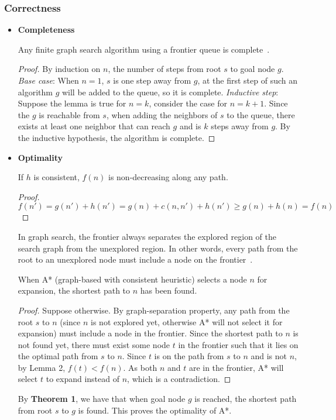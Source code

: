 \documentclass{llncs}
\begin{document}
\subsubsection{Correctness}
\begin{itemize}
	\item[] \textbf{Completeness}
	\begin{lemma} 
	Any finite graph search algorithm using a frontier queue is complete~\cite{sertac}.
	\end{lemma} 
	\begin{proof} 
	By induction on $n$, the number of steps from root $s$ to goal node $g$. \emph{Base case}: When $n=1$, $s$ is one step away from $g$, at the first step of such an algorithm $g$ will be added to the queue, so it is complete. \emph{Inductive step}: Suppose the lemma is true for $n=k$, consider the case for $n=k+1$. Since the $g$ is reachable from $s$, when adding the neighbors of $s$ to the queue, there exists at least one neighbor that can reach $g$ and is $k$ steps away from $g$. By the inductive hypothesis, the algorithm is complete. 
	\end{proof}
	\item[] \textbf{Optimality}
	\begin{lemma} 
	If $h$ is consistent, $f(n)$ is non-decreasing along any path.
	\end{lemma}
	\begin{proof}
	$f(n')=g(n')+h(n')=g(n)+c(n,n')+h(n') \geq g(n)+h(n)=f(n)$ 
	\end{proof}
	\begin{lemma}  In graph search, the frontier always separates the explored region of the search graph from the unexplored region. In other words, every path from the root to an unexplored node must include a node on the frontier~\cite{aima}. 
	\end{lemma}
	\begin{theorem}
	When A* (graph-based with consistent heuristic) selects a node $n$ for expansion, the shortest path to $n$ has been found. 
	\end{theorem}
	\begin{proof}
	Suppose otherwise. By graph-separation property, any path from the root $s$ to $n$ (since $n$ is not explored yet, otherwise A* will not select it for expansion) must include a node in the frontier. Since the shortest path to $n$ is not found yet, there must exist some node $t$ in the frontier such that it lies on the optimal path from $s$ to $n$. Since $t$ is on the path from $s$ to $n$ and is not $n$, by Lemma 2, $f(t)<f(n)$. As both $n$ and $t$ are in the frontier, A* will select $t$ to expand instead of $n$, which is a contradiction.
	\end{proof}
	By \textbf{Theorem 1}, we have that when goal node $g$ is reached, the shortest path from root $s$ to $g$ is found. This proves the optimality of A*.
\end{itemize}
\end{document}
